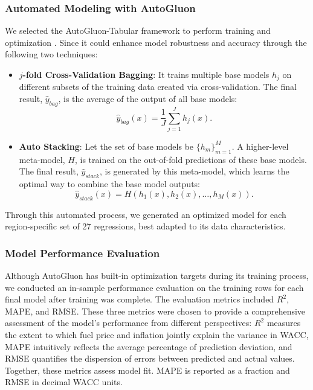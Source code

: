 \subsubsection{Automated Modeling with AutoGluon}
We selected the AutoGluon-Tabular framework to perform training and optimization \cite{autogluon2025docs}. Since it could enhance model robustness and accuracy through the following two techniques:
\begin{itemize}
    \item \textbf{$j$-fold Cross-Validation Bagging}: It trains multiple base models $h_j$ on different subsets of the training data created via cross-validation. The final result, $\hat{y}_{bag}$, is the average of the output of all base models:
    \begin{equation}
    \hat{y}_{bag}(x)=\frac{1}{J}\sum_{j=1}^{J}h_j(x).
    \end{equation}
    \item \textbf{Auto Stacking}: Let the set of base models be $\{h_m\}_{m=1}^{M}$. A higher-level meta-model, $H$, is trained on the out-of-fold predictions of these base models. The final result, $\hat{y}_{stack}$, is generated by this meta-model, which learns the optimal way to combine the base model outputs:
    \begin{equation}
    \hat{y}_{stack}(x)=H(h_1(x),h_2(x),\ldots,h_M(x)).
    \end{equation}
\end{itemize}
Through this automated process, we generated an optimized model for each region-specific set of 27 regressions, best adapted to its data characteristics.

\subsubsection{Model Performance Evaluation}
Although AutoGluon has built-in optimization targets during its training process, we conducted an in-sample performance evaluation on the training rows for each final model after training was complete. The evaluation metrics included $R^2$, MAPE, and RMSE. These three metrics were chosen to provide a comprehensive assessment of the model's performance from different perspectives: $R^2$ measures the extent to which fuel price and inflation jointly explain the variance in WACC, MAPE intuitively reflects the average percentage of prediction deviation, and RMSE quantifies the dispersion of errors between predicted and actual values. Together, these metrics assess model fit. MAPE is reported as a fraction and RMSE in decimal WACC units.

